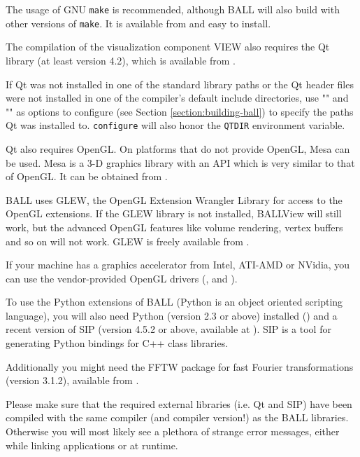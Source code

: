 The usage of GNU {\tt make} is recommended, although BALL will also build with
other versions of {\tt make}. It is available from 
and easy to install.

The compilation of the visualization component VIEW also requires the Qt 
library (at least version 4.2), which is available from
.

If Qt was not installed in one of the standard library paths or the
Qt header files were not installed in one of the compiler's default
include directories, use \mbox{""} and
\mbox{""} as options to configure (see
Section \ref{section:building-ball}) to specify the paths Qt was installed
to. {\tt configure} will also honor the {\tt QTDIR} environment variable.

Qt also requires OpenGL. On platforms that do not provide OpenGL, Mesa can
be used. Mesa is a 3-D graphics library with an API which is 
very similar to that of OpenGL. It can be obtained from 
.

BALL uses GLEW, the OpenGL Extension Wrangler Library for access to the OpenGL
extensions. If the GLEW library is not installed, BALLView will still work, but
the advanced OpenGL features like volume rendering, vertex buffers and so on
will not work. GLEW is freely available from .

If your machine has a graphics accelerator from Intel, ATI-AMD or NVidia, you
can use the vendor-provided OpenGL drivers
(,
 and
).

To use the Python extensions of BALL (Python is an object oriented scripting
language), you will also need Python (version 2.3 or above) installed
() and a recent version of SIP (version 4.5.2 or
above, available at ). SIP is a
tool for generating Python bindings for C++ class libraries.

Additionally you might need the FFTW package for fast Fourier transformations
(version 3.1.2), available from .

Please make sure that the required external \CPP libraries (i.e. Qt and SIP)
have been compiled with the same compiler (and compiler version!) as the BALL
libraries. Otherwise you will most likely see a plethora of strange error
messages, either while linking applications or at runtime.

